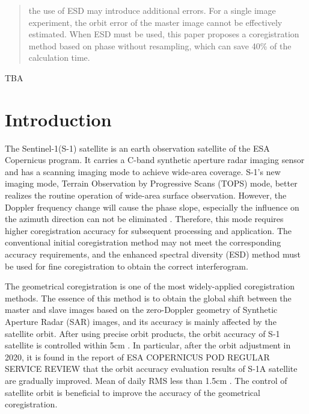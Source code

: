 \documentclass[preprint, authoryear]{elsarticle}
\begin{document}
\begin{frontmatter}
\begin{abstract}
the use of ESD may introduce additional errors. For a single image experiment, the orbit error of the master image cannot be effectively estimated. When ESD must be used, this paper proposes a coregistration method based on phase without resampling, which can save 40\% of the calculation time.
%
\end{abstract}

\begin{keyword}
TBA
%
\end{keyword}

\end{frontmatter}




\section{Introduction}
The Sentinel-1(S-1) satellite is an earth observation satellite of the ESA Copernicus program. It carries a C-band synthetic aperture radar imaging sensor and has a scanning imaging mode to achieve wide-area coverage. S-1’s new imaging mode, Terrain Observation by Progressive Scans (TOPS) mode, better realizes the routine operation of wide-area surface observation. However, the Doppler frequency change will cause the phase slope, especially the influence on the azimuth direction can not be eliminated \cite{A_Study_of_Sentinel-1_TOPS_Mode_Co-registration}. Therefore, this mode requires higher coregistration accuracy for subsequent processing and application. The conventional initial coregistration method may not meet the corresponding accuracy requirements, and the enhanced spectral diversity (ESD) method must be used for fine coregistration to obtain the correct interferogram. \par

The geometrical coregistration is one of the most widely-applied coregistration methods. The essence of this method is to obtain the global shift between the master and slave images based on the zero-Doppler geometry of Synthetic Aperture Radar (SAR) images, and its accuracy is mainly affected by the satellite orbit. After using precise orbit products, the orbit accuracy of S-1 satellite is controlled within 5cm \cite{Interferometric_Processing_of_Sentinel-1_TOPS_Data, A_Study_of_Sentinel-1_TOPS_Mode_Co-registration}. In particular, after the orbit adjustment in 2020, it is found in the report of ESA COPERNICUS POD REGULAR SERVICE REVIEW that the orbit accuracy evaluation results of S-1A satellite are gradually improved. Mean of daily RMS less than 1.5cm \cite{copernicus_review_2020.10-2020.12, copernicus_review_2021.01-2021.12, copernicus_review_2022.01-2022.12}. The control of satellite orbit is beneficial to improve the accuracy of the geometrical coregistration. \par
\end{document}
